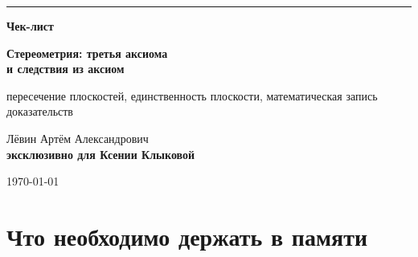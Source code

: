 \documentclass[a4paper,12pt]{article}
\begin{document}
\begin{titlepage}
\thispagestyle{empty}

\begin{center}

\vspace*{25mm}

{\color{accent}\rule{0.22\linewidth}{1.1pt}}

\vspace{12mm}

{\Huge\bfseries Чек-лист}

\vspace{6mm}

{\LARGE\bfseries
Стереометрия:
третья аксиома\\[2mm]
и следствия из аксиом
}

\vspace{12mm}

{\large
пересечение плоскостей,
единственность плоскости,
математическая запись доказательств
}

\vspace{24mm}

{\large
Лёвин Артём Александрович\\[2mm]
\textbf{эксклюзивно для Ксении Клыковой}
}

\vfill

{\large \today}

\vspace{16mm}


\end{center}

\end{titlepage}


\section{Что необходимо держать в памяти}
\end{document}
